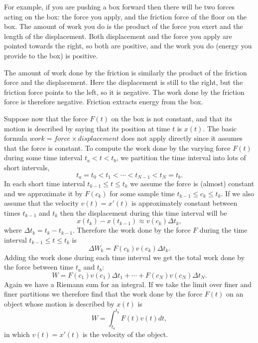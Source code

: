 \noindent%
For example, if you are pushing a box forward then there will be two forces
acting on the box: the force you apply, and the friction force of the floor on
the box. The amount of work you do is the product of the force you exert and the
length of the displacement.  Both displacement and the force you apply are
pointed towards the right, so both are positive, and the work you do (energy you
provide to the box) is positive.

The amount of work done by the friction is similarly the product of the friction
force and the displacement.  Here the displacement is still to the right, but
the friction force points to the left, so it is negative.  The work done by the
friction force is therefore negative.  Friction extracts energy from the box.

Suppose now that the force $F(t)$ on the box is not constant, and that its
motion is described by saying that its position at time $t$ is $x(t)$.  The
basic formula $\textit{work} = \textit{force}\times\textit{displacement}$ does
not apply directly since it assumes that the force is constant.  To compute the
work done by the varying force $F(t)$ during some time interval $t_a < t < t_b$,
we partition the time interval into lots of short intervals, 
\[
t_a = t_0 < t_1< \cdots < t_{N-1} < t_N = t_b.
\]
In each short time interval $t_{k-1}\leq t\leq t_k$ we assume the force is
(almost) constant and we approximate it by $F(c_k)$ for some sample time
$t_{k-1}\leq c_k\leq t_k$.  If we also assume that the velocity $v(t) = x'(t)$
is approximately constant between times $t_{k-1}$ and $t_k$ then the
displacement during this time interval will be
\[
x(t_k)-x(t_{k-1}) \approx v(c_k) \Delta t_k,
\]
where $\Delta t_k = t_k-t_{k-1}$.  Therefore the work done by the force $F$
during the time interval $t_{k-1}\leq t\leq t_k$ is
\[
\Delta W_k = F(c_k)v(c_k)\Delta t_k.
\]
Adding the work done during each time interval we get the total work done by the
force between time $t_a$ and $t_b$:
\[
W = F(c_1)v(c_1)\Delta t_1 + \cdots + F(c_N)v(c_N)\Delta t_N.
\]
Again we have a Riemann sum for an integral.  If we take the limit over finer
and finer partitions we therefore find that the work done by the force $F(t)$ on
an object whose motion is described by $x(t)$ is
\begin{equation}
  \label{eq:work-done-by-F}
  W = \int_{t_a}^{t_b} F(t) v(t) dt,
\end{equation}
in which $v(t) = x'(t)$ is the velocity of the object.

